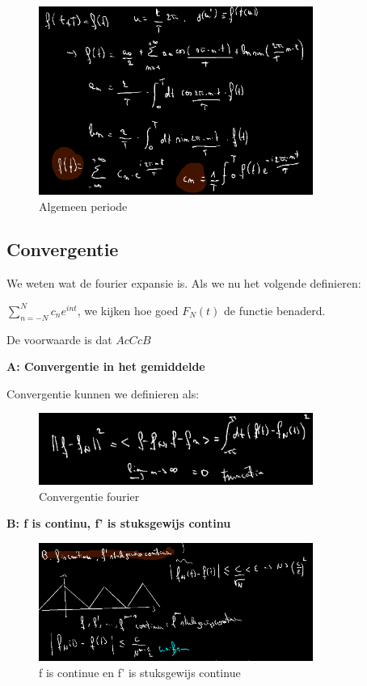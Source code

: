 \documentclass[a4paper]{report}
\begin{document}
\begin{figure}[H]
	\centering
	\includegraphics[width=0.8\textwidth]{assets/algemeen_periode_fourier.png}
	\caption{Algemeen periode}
	\label{fig:algemeen_periode_fourier}
\end{figure}

\subsection{Convergentie}

We weten wat de fourier expansie is. Als we nu het volgende definieren:

$\sum_{n=-N}^{N} c_n e^{int}$, we kijken hoe goed $F_N(t)$ de functie benaderd.

De voorwaarde is dat $A c C c B$

\textbf{A: Convergentie in het gemiddelde}

Convergentie kunnen we definieren als:

\begin{figure}[H]
	\centering
	\includegraphics[width=0.8\textwidth]{assets/convergentie_fourier.png}
	\caption{Convergentie fourier}
	\label{fig:convergentie_fourier}
\end{figure}

\textbf{B: f is continu, f' is stuksgewijs continu}

\begin{figure}[H]
	\centering
	\includegraphics[width=0.8\textwidth]{assets/f_is_continue_and_f_acc_is_stukgewijs_continue.png}
	\caption{f is continue en f' is stuksgewijs continue}
	\label{fig:f_is_continue_and_f_acc_is_stukgewijs_continue}
\end{figure}
\end{document}
